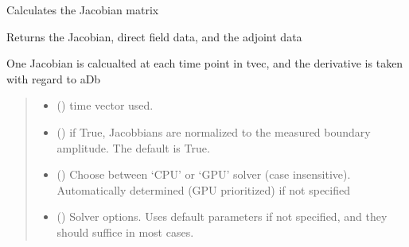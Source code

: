 \documentclass[letterpaper,10pt,english]{sphinxmanual}
\begin{document}
\begin{fulllineitems}
\begin{fulllineitems}
\label{\detokenize{_autosummary/nirfasterff.base.dcs_mesh.dcsmesh:nirfasterff.base.dcs_mesh.dcsmesh.jacobian}}
\pysigstartsignatures
\pysiglinewithargsret
{}
{\sphinxparamcomma {}\sphinxparamcomma {}\sphinxparamcomma {}}
{}
\pysigstopsignatures
\sphinxAtStartPar
Calculates the Jacobian matrix

\sphinxAtStartPar
Returns the Jacobian, direct field data, and the adjoint data

\sphinxAtStartPar
One Jacobian is calcualted at each time point in tvec, and the derivative is taken with regard to aDb
\begin{quote}\begin{description}
\begin{itemize}
\item {} 
\sphinxAtStartPar
{} () \textendash{} time vector used.

\item {} 
\sphinxAtStartPar
{} (\sphinxstyleliteralemphasis{\sphinxupquote{, }}) \textendash{} if True, Jacobbians are normalized to the measured boundary amplitude. The default is True.

\item {} 
\sphinxAtStartPar
{} (\sphinxstyleliteralemphasis{\sphinxupquote{, }}) \textendash{} Choose between ‘CPU’ or ‘GPU’ solver (case insensitive). Automatically determined (GPU prioritized) if not specified

\item {} 
\sphinxAtStartPar
{} ({\hyperref[\detokenize{_autosummary/nirfasterff.utils.SolverOptions:nirfasterff.utils.SolverOptions}]{}}\sphinxstyleliteralemphasis{\sphinxupquote{, }}) \textendash{} 
\sphinxAtStartPar
Solver options. Uses default parameters if not specified, and they should suffice in most cases.


\end{itemize}
\end{description}
\end{quote}
\end{fulllineitems}
\end{fulllineitems}
\end{document}
